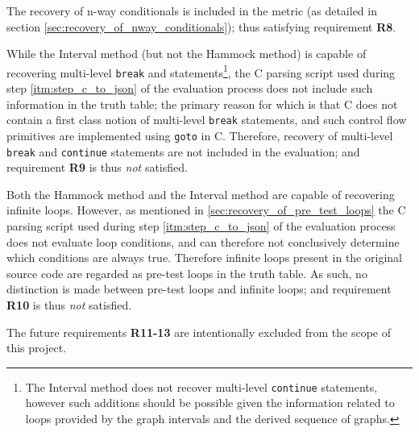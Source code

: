 The recovery of n-way conditionals is included in the metric (as detailed in section \ref{sec:recovery_of_nway_conditionals}); thus satisfying requirement \textbf{R8}.

While the Interval method (but not the Hammock method) is capable of recovering multi-level \texttt{break} and statements\footnote{The Interval method does not recover multi-level \texttt{continue} statements, however such additions should be possible given the information related to loops provided by the graph intervals and the derived sequence of graphs.}, the C parsing script used during step \ref{itm:step_c_to_json} of the evaluation process does not include such information in the truth table; the primary reason for which is that C does not contain a first class notion of multi-level \texttt{break} statements, and such control flow primitives are implemented using \texttt{goto} in C. Therefore, recovery of multi-level \texttt{break} and \texttt{continue} statements are not included in the evaluation; and requirement \textbf{R9} is thus \textit{not} satisfied.

Both the Hammock method and the Interval method are capable of recovering infinite loops. However, as mentioned in \ref{sec:recovery_of_pre_test_loops} the C parsing script used during step \ref{itm:step_c_to_json} of the evaluation process does not evaluate loop conditions, and can therefore not conclusively determine which conditions are always true. Therefore infinite loops present in the original source code are regarded as pre-test loops in the truth table. As such, no distinction is made between pre-test loops and infinite loops; and requirement \textbf{R10} is thus \textit{not} satisfied.

The future requirements \textbf{R11-13} are intentionally excluded from the scope of this project.

